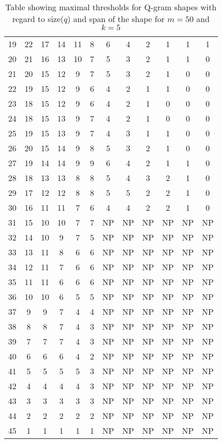 \documentclass[paper=a4, fontsize=11pt]{scrartcl} %
\numberwithin{equation}{section} %
\numberwithin{figure}{section} %
\numberwithin{table}{section} %
\begin{document}
\begin{table}[H]
\begin{tabular} {|c|c|c|c|c|c|c|c|c|c|c|c|}
	19 & 22 & 17 & 14 & 11 & 8 & 6 & 4 & 2 & 1 & 1 & 1 \\
	20 & 21 & 16 & 13 & 10 & 7 & 5 & 3 & 2 & 1 & 1 & 0 \\
	21 & 20 & 15 & 12 & 9 & 7 & 5 & 3 & 2 & 1 & 0 & 0 \\
	22 & 19 & 15 & 12 & 9 & 6 & 4 & 2 & 1 & 1 & 0 & 0 \\
	23 & 18 & 15 & 12 & 9 & 6 & 4 & 2 & 1 & 0 & 0 & 0 \\
	24 & 18 & 15 & 13 & 9 & 7 & 4 & 2 & 1 & 0 & 0 & 0 \\
	25 & 19 & 15 & 13 & 9 & 7 & 4 & 3 & 1 & 1 & 0 & 0 \\
	26 & 20 & 15 & 14 & 9 & 8 & 5 & 3 & 2 & 1 & 0 & 0 \\
	27 & 19 & 14 & 14 & 9 & 9 & 6 & 4 & 2 & 1 & 1 & 0 \\
	28 & 18 & 13 & 13 & 8 & 8 & 5 & 4 & 3 & 2 & 1 & 0 \\
	29 & 17 & 12 & 12 & 8 & 8 & 5 & 5 & 2 & 2 & 1 & 0 \\
	30 & 16 & 11 & 11 & 7 & 6 & 4 & 4 & 2 & 2 & 1 & 0 \\
	31 & 15 & 10 & 10 & 7 & 7 & NP & NP & NP & NP & NP & NP \\
	32 & 14 & 10 & 9 & 7 & 5 & NP & NP & NP & NP & NP & NP \\
	33 & 13 & 11 & 8 & 6 & 6 & NP & NP & NP & NP & NP & NP \\
	34 & 12 & 11 & 7 & 6 & 6 & NP & NP & NP & NP & NP & NP \\
	35 & 11 & 11 & 6 & 6 & 6 & NP & NP & NP & NP & NP & NP \\
	36 & 10 & 10 & 6 & 5 & 5 & NP & NP & NP & NP & NP & NP \\
	37 & 9 & 9 & 7 & 4 & 4 & NP & NP & NP & NP & NP & NP \\
	38 & 8 & 8 & 7 & 4 & 3 & NP & NP & NP & NP & NP & NP \\
	39 & 7 & 7 & 7 & 4 & 3 & NP & NP & NP & NP & NP & NP \\
	40 & 6 & 6 & 6 & 4 & 2 & NP & NP & NP & NP & NP & NP \\
	41 & 5 & 5 & 5 & 5 & 3 & NP & NP & NP & NP & NP & NP \\
	42 & 4 & 4 & 4 & 4 & 3 & NP & NP & NP & NP & NP & NP \\
	43 & 3 & 3 & 3 & 3 & 3 & NP & NP & NP & NP & NP & NP \\
	44 & 2 & 2 & 2 & 2 & 2 & NP & NP & NP & NP & NP & NP \\
	45 & 1 & 1 & 1 & 1 & 1 & NP & NP & NP & NP & NP & NP \\
\end{tabular}
\caption{Table showing maximal thresholds for Q-gram shapes with regard to
size($q$) and span of the shape for $m=50$ and $k=5$}
\label{tab:res2}
\end{table}
\end{document}
